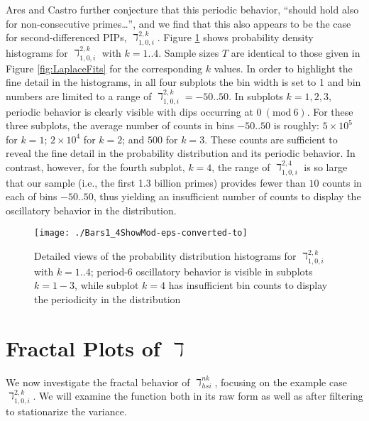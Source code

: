 \documentclass[12pt,longtitle,times]{amsart}
\begin{document}
Ares and Castro \cite{Ares-Hidden-2006} further conjecture that this periodic behavior, ``should hold also for non-consecutive primes\dots'', and we find that this also appears to be the case for second-differenced PIPs, $\daleth_{1,0,i}^{2,k}$. Figure \ref{fig:Bars1_4ShowMod} shows probability density histograms for $\daleth_{1,0,i}^{2,k}$ with $k=1..4$. Sample sizes $T$ are identical to those given in Figure \ref{fig:LaplaceFits} for the corresponding $k$ values. In order to highlight the fine detail in the histograms, in all four subplots the bin width is set to 1 and bin numbers are limited to a range of $\daleth_{1,0,i}^{2,k}=-50..50$. In subplots $k=1,2,3$, periodic behavior is clearly visible with dips occurring at $0{\ (\text{mod}\ {6})}$. For these three subplots, the average number of counts in bins $-50..50$ is roughly: $5\times{}10^5$ for $k=1$; $2\times{}10^4$ for $k=2$; and $500$ for $k=3$. These counts are sufficient to reveal the fine detail in the probability distribution and its periodic behavior. In contrast, however, for the fourth subplot, $k=4$, the range of $\daleth_{1,0,i}^{2,4}$ is so large that our sample (i.e., the first 1.3 billion primes) provides fewer than $10$ counts in each of bins $-50..50$, thus yielding an insufficient number of counts to display the oscillatory behavior in the distribution. 

\begin{figure}[h]
\texttt{[image: ./Bars1\_4ShowMod-eps-converted-to]}
\caption{Detailed views of the probability distribution histograms for $\daleth_{1,0,i}^{2,k}$ with $k=1..4$; period-6 oscillatory behavior is visible in subplots $k=1-3$, while subplot $k=4$ has insufficient bin counts to display the periodicity in the distribution}
\label{fig:Bars1_4ShowMod}
\end{figure}

\section{Fractal Plots of $\daleth$} 
 
We now investigate the fractal behavior of $\daleth_{hsi}^{nk}$, focusing on the example case $\daleth_{1,0,i}^{2,k}$. We will examine the function both in its raw form as well as after filtering to stationarize the variance.
\end{document}

